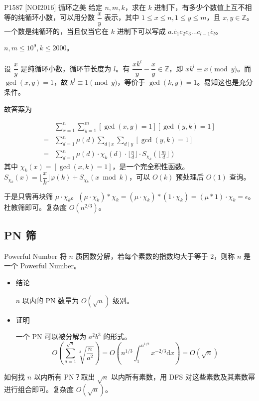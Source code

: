 \documentclass [hyperref={bookmarksdepth=4}, aspectratio=169] {beamer}
\theoremstyle {fy}
\def\Z{\mathbb{Z}}
\begin{document}
\begin{frame}{P1587 [NOI2016] 循环之美}
给定 $n,m,k$，求在 $k$ 进制下，有多少个数值上互不相等的纯循环小数，可以用分数 $\dfrac{x}{y}$ 表示，其中 $1\le x\le n,1\le y\le m$，且 $x,y\in\Z$。一个数是纯循环的，当且仅当它在 $k$ 进制下可以写成 $a.\dot{c_1}c_2c_3\dots c_{l-1}\dot{c_l}$。

$n,m\le 10^9,k\le 2000$。

设 $\dfrac{x}{y}$ 是纯循环小数，循环节长度为 $l$。有 $\dfrac{xk^l}{y}-\dfrac{x}{y}\in\Z$，即 $xk^l\equiv x\pmod y$。而 $\gcd(x,y)=1$，故 $k^l\equiv 1\pmod y$，等价于 $\gcd(k,y)=1$。易知这也是充分条件。

故答案为

$$
\begin{aligned}
&\sum\limits_{x=1}^n\sum\limits_{y=1}^m[\gcd(x,y)=1][\gcd(y,k)=1]\\
=&\sum_{d=1}^n\mu(d)\sum_{d\mid x}\sum_{d\mid y}[\gcd(y,k)=1]\\
=&\sum_{d=1}^n\mu(d)\cdot\chi_k(d)\cdot\lfloor\frac{n}{d}\rfloor\cdot S_{\chi_k}(\lfloor\frac{m}{d}\rfloor)
\end{aligned}
$$
其中 $\chi_k(x)=[\gcd(x,k)=1]$，是一个完全积性函数。$S_{\chi_k}(x)=\lfloor\dfrac{x}{k}\rfloor\varphi(k)+S_{\chi_k}(x\bmod k)$，可以 $O(k)$ 预处理后 $O(1)$ 查询。

于是只需再块筛 $\mu\cdot\chi_k$。$(\mu\cdot\chi_k)*\chi_k=(\mu\cdot\chi_k)*(1\cdot\chi_k)=(\mu*1)\cdot\chi_k=\epsilon$。杜教筛即可。复杂度 $O(n^{2/3})$。
\end{frame}

\subsection{PN 筛}

\begin{frame}{Powerful Number}
将 $n$ 质因数分解，若每个素数的指数均大于等于 $2$，则称 $n$ 是一个 Powerful Number。

\begin{itemize}
    \item 结论

  $n$ 以内的 PN 数量为 $O(\sqrt n)$ 级别。

    \item 证明

  一个 PN 可以被分解为 $a^2b^3$ 的形式。
  $$
  O(\sum_{a=1}^{\sqrt n}\sqrt[3]{\frac{n}{a^2}})=O(n^{1/3}\int_{1}^{n^{1/2}}x^{-2/3}\mathrm{d}x)=O(\sqrt n)
  $$
\end{itemize}

如何找 $n$ 以内所有 PN？取出 $\sqrt n$ 以内所有素数，用 DFS 对这些素数及其素数幂进行组合即可。复杂度 $O(\sqrt n)$。
\end{frame}
\end{document}

